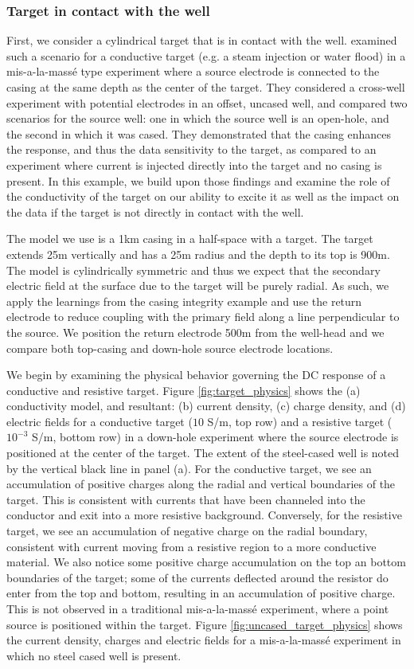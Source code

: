 \subsubsection{Target in contact with the well}
First, we consider a cylindrical target that is in contact with the well. \cite{Schenkel1994} examined such a scenario for a conductive target (e.g. a steam injection or water flood) in a mis-a-la-mass\'e type experiment where a source electrode is connected to the casing at the same depth as the center of the target. They considered a cross-well experiment with potential electrodes in an offset, uncased well, and compared two scenarios for the source well: one in which the source well is an open-hole, and the second in which it was cased. They demonstrated that the casing enhances the response, and thus the data sensitivity to the target, as compared to an experiment where current is injected directly into the target and no casing is present. In this example, we build upon those findings and examine the role of the conductivity of the target on our ability to excite it as well as the impact on the data if the target is not directly in contact with the well.

The model we use is a 1km casing in a half-space with a target. The target extends 25m vertically and has a 25m radius and the depth to its top is 900m. The model is cylindrically symmetric and thus we expect that the secondary electric field at the surface due to the target will be purely radial. As such, we apply the learnings from the casing integrity example and use the return electrode to reduce coupling with the primary field along a line perpendicular to the source. We position the return electrode 500m from the well-head and we compare both top-casing and down-hole source electrode locations.

We begin by examining the physical behavior governing the DC response of a conductive and resistive target. Figure \ref{fig:target_physics} shows the (a) conductivity model, and resultant: (b) current density, (c) charge density, and (d) electric fields for a conductive target ($10$ S/m, top row) and a resistive target ($10^{-3}$ S/m, bottom row) in a down-hole experiment where the source electrode is positioned at the center of the target. The extent of the steel-cased well is noted by the vertical black line in panel (a). For the conductive target, we see an accumulation of positive charges along the radial and vertical boundaries of the target. This is consistent with currents that have been channeled into the conductor and exit into a more resistive background. Conversely, for the resistive target, we see an accumulation of negative charge on the radial boundary, consistent with current moving from a resistive region to a more conductive material. We also notice some positive charge accumulation on the top an bottom boundaries of the target; some of the currents deflected around the resistor do enter from the top and bottom, resulting in an accumulation of positive charge. This is not observed in a traditional mis-a-la-mass\'e experiment, where a point source is positioned within the target. Figure \ref{fig:uncased_target_physics} shows the current density, charges and electric fields for a mis-a-la-mass\'e experiment in which no steel cased well is present.

